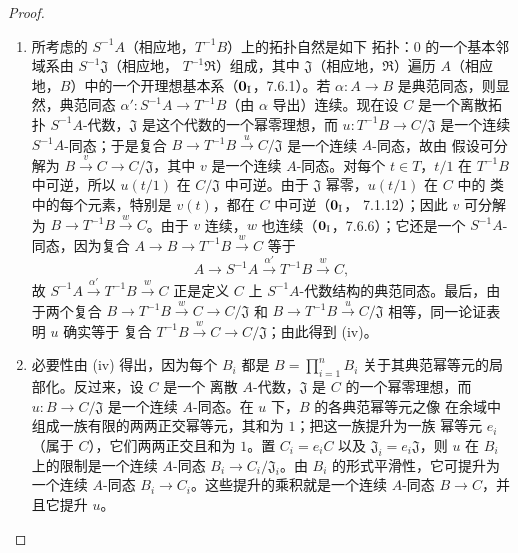 \begin{proof}
\begin{enumerate}
  (iii)。
  \item[(iv)] 所考虑的 $S^{-1}A$（相应地，$T^{-1}B$）上的拓扑自然是如下
  拓扑：$0$ 的一个基本邻域系由 $S^{-1}\mathfrak J$（相应地，
  $T^{-1}\mathfrak R$）组成，其中 $\mathfrak J$（相应地，$\mathfrak R$）遍历
  $A$（相应地，$B$）中的一个开理想基本系（$\mathbf 0_{\rm I}$，7.6.1）。若
  $\alpha:A\to B$ 是典范同态，则显然，典范同态
  $\alpha':S^{-1}A\to T^{-1}B$（由 $\alpha$ 导出）连续。现在设 $C$ 是一个离散拓扑
  $S^{-1}A$-代数，$\mathfrak J$ 是这个代数的一个幂零理想，而
  $u:T^{-1}B\to C/\mathfrak J$ 是一个连续 $S^{-1}A$-同态；于是复合
  $B\to T^{-1}B\xrightarrow{u}C/\mathfrak J$ 是一个连续 $A$-同态，故由
  假设可分解为 $B\xrightarrow{v}C\to C/\mathfrak J$，其中 $v$ 是一个连续
  $A$-同态。对每个 $t\in T$，$t/1$ 在 $T^{-1}B$ 中可逆，所以 $u(t/1)$
  在 $C/\mathfrak J$ 中可逆。由于 $\mathfrak J$ 幂零，$u(t/1)$ 在 $C$ 中的
  类中的每个元素，特别是 $v(t)$，都在 $C$ 中可逆（$\mathbf 0_{\rm I}$，
  7.1.12）；因此 $v$ 可分解为 $B\to T^{-1}B\xrightarrow{w}C$。由于 $v$
  连续，$w$ 也连续（$\mathbf 0_{\rm I}$，7.6.6）；它还是一个
  $S^{-1}A$-同态，因为复合 $A\to B\to T^{-1}B\xrightarrow{w}C$ 等于
  \[
    A\to S^{-1}A\xrightarrow{\alpha'}T^{-1}B\xrightarrow{w}C,
  \]
  故 $S^{-1}A\xrightarrow{\alpha'}T^{-1}B\xrightarrow{w}C$ 正是定义 $C$ 上
  $S^{-1}A$-代数结构的典范同态。最后，由于两个复合
  $B\to T^{-1}B\xrightarrow{w}C\to C/\mathfrak J$ 和
  $B\to T^{-1}B\xrightarrow{u}C/\mathfrak J$ 相等，同一论证表明 $u$ 确实等于
  复合 $T^{-1}B\xrightarrow{w}C\to C/\mathfrak J$；由此得到 (iv)。
  \item[(v)] 必要性由 (iv) 得出，因为每个 $B_i$ 都是
  $B=\prod_{i=1}^n B_i$ 关于其典范幂等元的局部化。反过来，设 $C$ 是一个
  离散 $A$-代数，$\mathfrak J$ 是 $C$ 的一个幂零理想，而
  $u:B\to C/\mathfrak J$ 是一个连续 $A$-同态。在 $u$ 下，$B$ 的各典范幂等元之像
  在余域中组成一族有限的两两正交幂等元，其和为 $1$；把这一族提升为一族
  幂等元 $e_i$（属于 $C$），它们两两正交且和为 $1$。置 $C_i=e_iC$ 以及
  $\mathfrak J_i=e_i\mathfrak J$，则 $u$ 在 $B_i$ 上的限制是一个连续
  $A$-同态 $B_i\to C_i/\mathfrak J_i$。由 $B_i$ 的形式平滑性，它可提升为
  一个连续 $A$-同态 $B_i\to C_i$。这些提升的乘积就是一个连续
  $A$-同态 $B\to C$，并且它提升 $u$。
\end{enumerate}
\end{proof}


